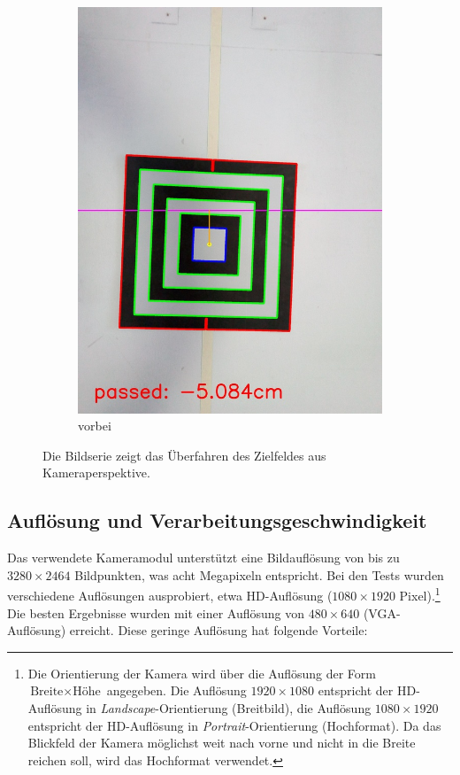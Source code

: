 \begin{figure}
\begin{subfigure}{0.3\textwidth}
        \includegraphics[width=0.95\linewidth]{pics/zielfeld/09.jpg}
        \caption{vorbei}
        \label{fig:zielfeld9}
    \end{subfigure}
    \label{fig:bildserie}
    \caption{Die Bildserie zeigt das Überfahren des Zielfeldes aus Kameraperspektive.}
\end{figure}

\subsection{Auflösung und Verarbeitungsgeschwindigkeit}

Das verwendete Kameramodul \cite{picam} unterstützt eine Bildauflösung von bis zu $3280\times2464$ Bildpunkten, was acht Megapixeln entspricht. Bei den Tests wurden verschiedene Auflösungen ausprobiert, etwa HD-Auflösung ($1080\times1920$ Pixel).\footnote{Die Orientierung der Kamera wird über die Auflösung der Form $\text{Breite}\times\text{Höhe}$ angegeben. Die Auflösung $1920\times1080$ entspricht der HD-Auflösung in \textit{Landscape}-Orientierung (Breitbild), die Auflösung $1080\times1920$ entspricht der HD-Auflösung in \textit{Portrait}-Orientierung (Hochformat). Da das Blickfeld der Kamera möglichst weit nach vorne und nicht in die Breite reichen soll, wird das Hochformat verwendet.} Die besten Ergebnisse wurden mit einer Auflösung von $480\times640$ (VGA-Auflösung) erreicht. Diese geringe Auflösung hat folgende Vorteile:

